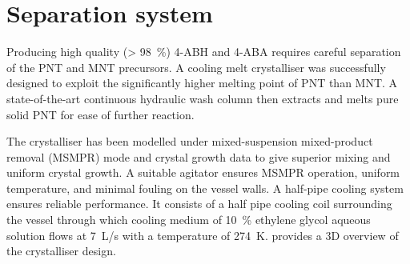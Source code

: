\section*{Separation system}

Producing high quality (\SI{> 98}{\percent}) 4-ABH and 4-ABA requires careful separation of the PNT and MNT precursors. A cooling melt crystalliser was successfully designed to exploit the significantly higher melting point of PNT than MNT. A state-of-the-art continuous hydraulic wash column then extracts and melts pure solid PNT for ease of further reaction. 


The crystalliser has been modelled under mixed-suspension mixed-product removal (MSMPR) mode and crystal growth data to give superior mixing and uniform crystal growth. A suitable agitator ensures MSMPR operation, uniform temperature, and minimal fouling on the vessel walls. A half-pipe cooling system ensures reliable performance. It consists of a half pipe cooling coil surrounding the vessel through which cooling medium of \SI{10}{\percent} ethylene glycol aqueous solution flows at \SI{7}{L/s} with a temperature of \SI{274}{K}.  provides a 3D overview of the crystalliser design.


